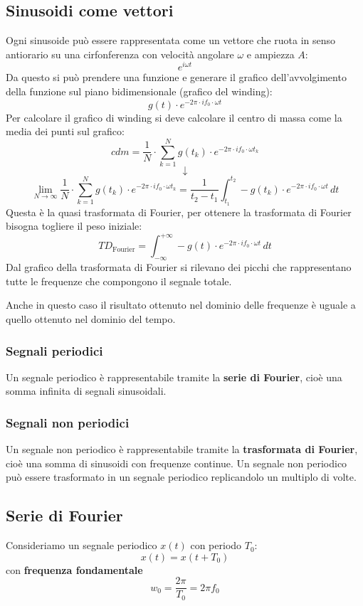 \documentclass[a4paper]{article}
\begin{document}
\subsection{Sinusoidi come vettori}
Ogni sinusoide può essere rappresentata come un vettore che ruota in senso antiorario
su una cirfonferenza con velocità angolare \( \omega \) e ampiezza \( A \):
\[
  e^{i \omega t}
\] 
Da questo si può prendere una funzione e generare il grafico dell'avvolgimento
della funzione sul piano bidimensionale (grafico del winding):
\[
  g(t) \cdot e^{-2\pi \cdot i  f_0 \cdot \omega t}
\] 
Per calcolare il grafico di winding si deve calcolare il centro di massa come la media
dei punti sul grafico:
\[
    cdm = \frac{1}{N} \cdot \sum_{k=1}^N g(t_k) \cdot e^{-2\pi \cdot i f_0 \cdot \omega t_k}
\] 
\[
\downarrow
\] 
\[
  \lim_{N \to \infty} \frac{1}{N} \cdot \sum_{k=1}^N g(t_k) \cdot e^{-2\pi \cdot i f_0 \cdot \omega t_k} = \frac{1}{t_2-t_1} \int_{t_1}^{t_2} -g(t_k) \cdot e^{-2\pi \cdot if_0 \cdot \omega t} \, dt
\] 
Questa è la quasi trasformata di Fourier, per ottenere la trasformata di Fourier
bisogna togliere il peso iniziale:
\[
 TD_{\text{Fourier}} = \int_{-\infty}^{+\infty} -g(t) \cdot e^{-2\pi \cdot i f_0 \cdot \omega t} \, dt
\] 
Dal grafico della trasformata di Fourier si rilevano dei picchi che rappresentano
tutte le frequenze che compongono il segnale totale.

\vspace{1em}
\noindent
Anche in questo caso il risultato ottenuto nel dominio delle frequenze è uguale
a quello ottenuto nel dominio del tempo.


\subsubsection{Segnali periodici}
Un segnale periodico è rappresentabile tramite la \textbf{serie di Fourier}, cioè una
somma infinita di segnali sinusoidali.

\subsubsection{Segnali non periodici}
Un segnale non periodico è rappresentabile tramite la \textbf{trasformata di Fourier},
cioè una somma di sinusoidi con frequenze continue.
Un segnale non periodico può essere trasformato in un segnale periodico replicandolo
un multiplo di volte.

\subsection{Serie di Fourier}
Consideriamo un segnale periodico \( x(t) \) con periodo \( T_0 \):
\[
x(t) = x(t + T_0)
\] 
con \textbf{frequenza fondamentale}
\[
  w_0 = \frac{2\pi}{T_0} = 2\pi f_0
\] 
\end{document}
